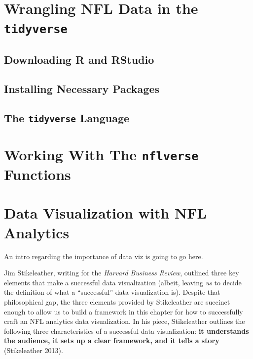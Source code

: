 \documentclass[
  letterpaper,
]{krantz}
\begin{document}

\hypertarget{wrangling-nfl-data-in-the-tidyverse}{%
\chapter{\texorpdfstring{Wrangling NFL Data in the
\texttt{tidyverse}}{Wrangling NFL Data in the tidyverse}}\label{wrangling-nfl-data-in-the-tidyverse}}

\hypertarget{downloading-r-and-rstudio}{%
\section{Downloading R and RStudio}\label{downloading-r-and-rstudio}}

\hypertarget{installing-necessary-packages}{%
\section{Installing Necessary
Packages}\label{installing-necessary-packages}}

\hypertarget{the-tidyverse-language}{%
\section{\texorpdfstring{The \texttt{tidyverse}
Language}{The tidyverse Language}}\label{the-tidyverse-language}}


\hypertarget{working-with-the-nflverse-functions}{%
\chapter{\texorpdfstring{Working With The \texttt{nflverse}
Functions}{Working With The nflverse Functions}}\label{working-with-the-nflverse-functions}}


\hypertarget{data-visualization-with-nfl-analytics}{%
\chapter{Data Visualization with NFL
Analytics}\label{data-visualization-with-nfl-analytics}}

An intro regarding the importance of data viz is going to go here.

Jim Stikeleather, writing for the \emph{Harvard Business Review},
outlined three key elements that make a successful data visualization
(albeit, leaving \emph{us} to decide the definition of what a
``successful'' data visualization is). Despite that philosophical gap,
the three elements provided by Stikeleather are succinct enough to allow
us to build a framework in this chapter for how to successfully craft an
NFL analytics data visualization. In his piece, Stikeleather outlines
the following three characteristics of a successful data visualization:
\textbf{it understands the audience, it sets up a clear framework, and
it tells a story} (Stikeleather 2013).
\end{document}
